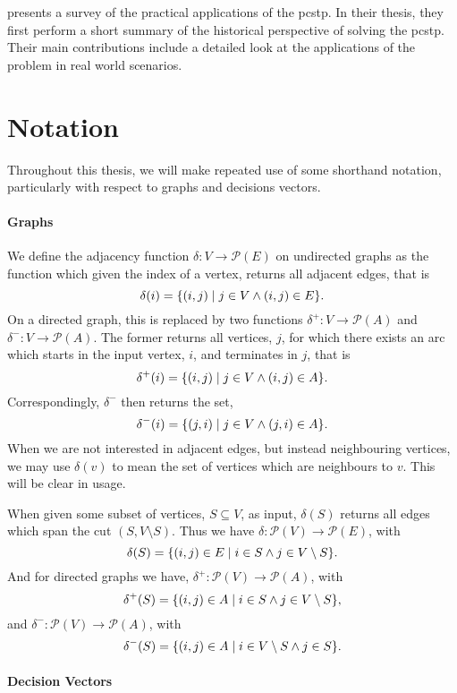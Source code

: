 \citet*{sun2018classical} presents a survey of the practical applications of the \gls{pcstp}.
In their thesis, they first perform a short summary of the historical perspective of
solving the \gls{pcstp}. Their main contributions include
a detailed look at the applications
of the problem in real world scenarios.

\section{Notation}\label{sec:intro:notation}

Throughout this thesis, we will make repeated use of some shorthand notation, particularly
with respect to graphs and decisions vectors.

\paragraph{Graphs}

We define the adjacency function $\delta : V \to \mathcal{P} (E)$ on undirected graphs as
the function which given the index of a vertex, returns all adjacent edges, that is
$$\delta(i) = \{(i,j) \mid j \in V \wedge (i, j) \in E\}\mathnormal{.}$$
On a directed graph, this is replaced by two functions
$\delta^+ : V \to \mathcal{P} (A)$
and $\delta^-: V \to \mathcal{P} (A)$.
The former returns all vertices, $j$, for which there exists an arc
which starts in the input vertex, $i$, and terminates in $j$, that is
$$\delta^+(i) = \{(i, j) \mid j \in V \wedge (i, j) \in A\}\mathnormal{.}$$
Correspondingly, $\delta^-$ then returns the set,
$$\delta^-(i) = \{(j, i) \mid j \in V \wedge (j, i) \in A\}\mathnormal{.}$$
When we are not interested in adjacent edges, but instead neighbouring vertices,
we may use $\delta(v)$ to mean the set of vertices which are neighbours to $v$.
This will be clear in usage.


When given some subset of vertices, $S \subseteq V$, as input,
$\delta(S)$ returns all edges which span the cut $(S, V \setminus S)$.
Thus we have $\delta : \mathcal{P}(V) \to \mathcal{P}(E)$, with
$$\delta(S) = \{(i,j) \in E \mid i \in S \wedge j \in V \setminus S\}\mathnormal{.}$$
And for directed graphs we have, $\delta^+ : \mathcal{P}(V) \to \mathcal{P}(A)$, with
$$\delta^+(S) = \{(i,j) \in A \mid i \in S \wedge j \in V \setminus S\}\mathnormal{,}$$
and $\delta^- : \mathcal{P}(V) \to \mathcal{P}(A)$, with
$$\delta^-(S) = \{(i,j) \in A \mid i \in V \setminus S \wedge j \in S\}\mathnormal{.}$$

\paragraph{Decision Vectors}

